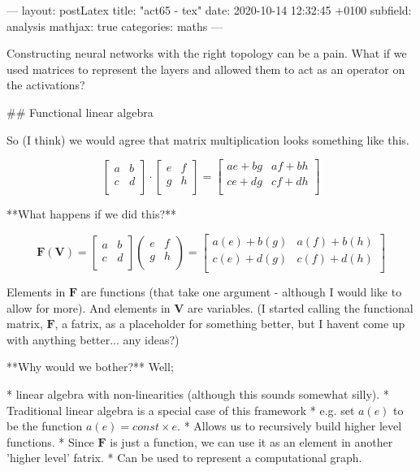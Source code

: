 ---
layout: postLatex
title:  "act65 - tex"
date:   2020-10-14 12:32:45 +0100
subfield: analysis
mathjax: true
categories: maths
---

Constructing neural networks with the right topology can be a pain. What if we used matrices to represent the layers and allowed them to act as an operator on the activations?

## Functional linear algebra

So (I think) we would agree that matrix multiplication looks something like this.

$$
\begin{bmatrix}
a & b\\
c & d\\
\end{bmatrix}
\cdot
\begin{bmatrix}
e & f\\
g & h\\
\end{bmatrix}
=
\begin{bmatrix}
ae+bg & af+bh\\
ce+dg & cf+dh\\
\end{bmatrix}
$$


**What happens if we did this?**


$$
\textbf{F}(\textbf{V}) =
\begin{bmatrix}
a & b\\
c & d\\
\end{bmatrix}
\begin{pmatrix}
e & f\\
g & h\\
\end{pmatrix}=
\begin{bmatrix}
a(e)+b(g) & a(f)+b(h)\\
c(e)+d(g) & c(f)+d(h)\\
\end{bmatrix}
$$

Elements in $\textbf{F}$ are functions (that take one argument - although I would like to allow for more). And elements in $\textbf{V}$ are variables. (I started calling the functional matrix, $\textbf{F}$, a fatrix, as a placeholder for something better, but I havent come up with anything better... any ideas?)

**Why would we bother?** Well;

* linear algebra with non-linearities (although this sounds somewhat silly).
* Traditional linear algebra is a special case of this framework
    * e.g. set $a(e)$ to be the function $a(e) = const\times e$.
* Allows us to recursively build higher level functions.
    * Since $\textbf{F}$ is just a function, we can use it as an element in another 'higher level' fatrix.
* Can be used to represent a computational graph.

